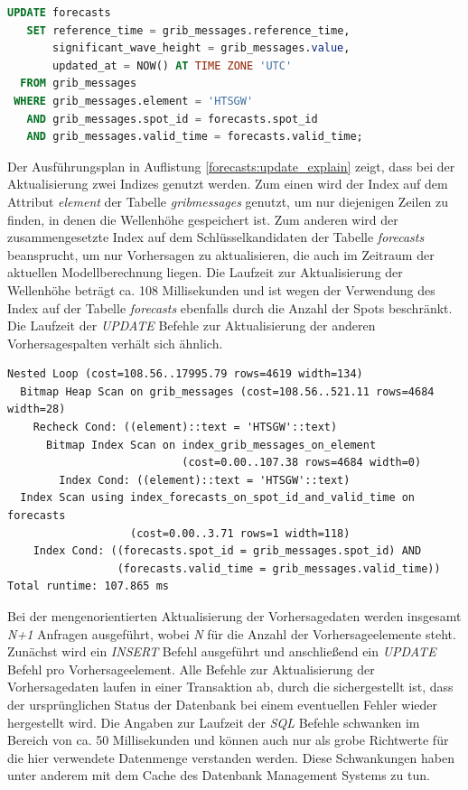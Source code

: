 \begin{lstlisting}[captionpos=b, caption=Aktualisierung der Wellenhöhe, label=forecasts:update, language=SQL]
UPDATE forecasts
   SET reference_time = grib_messages.reference_time,
       significant_wave_height = grib_messages.value,
       updated_at = NOW() AT TIME ZONE 'UTC'
  FROM grib_messages
 WHERE grib_messages.element = 'HTSGW'
   AND grib_messages.spot_id = forecasts.spot_id
   AND grib_messages.valid_time = forecasts.valid_time;
\end{lstlisting}

Der Ausführungsplan in Auflistung \ref{forecasts:update_explain}
zeigt, dass bei der Aktualisierung zwei Indizes genutzt werden. Zum
einen wird der Index auf dem Attribut \textit{element} der Tabelle
\textit{grib\textunderscore messages} genutzt, um nur diejenigen
Zeilen zu finden, in denen die Wellenhöhe gespeichert ist. Zum anderen
wird der zusammengesetzte Index auf dem Schlüsselkandidaten der
Tabelle \textit{forecasts} beansprucht, um nur Vorhersagen zu
aktualisieren, die auch im Zeitraum der aktuellen Modellberechnung
liegen. Die Laufzeit zur Aktualisierung der Wellenhöhe beträgt ca. 108
Millisekunden und ist wegen der Verwendung des Index auf der Tabelle
\textit{forecasts} ebenfalls durch die Anzahl der Spots
beschränkt. Die Laufzeit der \textit{UPDATE} Befehle zur
Aktualisierung der anderen Vorhersagespalten verhält sich ähnlich.

\begin{lstlisting}[captionpos=b, caption=Ausführungsplan der Aktualisierung, label=forecasts:update_explain]
Nested Loop (cost=108.56..17995.79 rows=4619 width=134)
  Bitmap Heap Scan on grib_messages (cost=108.56..521.11 rows=4684 width=28)
    Recheck Cond: ((element)::text = 'HTSGW'::text)
      Bitmap Index Scan on index_grib_messages_on_element  
                           (cost=0.00..107.38 rows=4684 width=0)
        Index Cond: ((element)::text = 'HTSGW'::text)
  Index Scan using index_forecasts_on_spot_id_and_valid_time on forecasts 
                   (cost=0.00..3.71 rows=1 width=118)
    Index Cond: ((forecasts.spot_id = grib_messages.spot_id) AND 
                 (forecasts.valid_time = grib_messages.valid_time))
Total runtime: 107.865 ms
\end{lstlisting}

Bei der mengenorientierten Aktualisierung der Vorhersagedaten werden
insgesamt \textit{N+1} Anfragen ausgeführt, wobei \textit{N} für die
Anzahl der Vorhersageelemente steht. Zunächst wird ein \textit{INSERT}
Befehl ausgeführt und anschließend ein \textit{UPDATE} Befehl pro
Vorhersageelement. Alle Befehle zur Aktualisierung der Vorhersagedaten
laufen in einer Transaktion ab, durch die sichergestellt ist, dass der
ursprünglichen Status der Datenbank bei einem eventuellen Fehler
wieder hergestellt wird. Die Angaben zur Laufzeit der \textit{SQL}
Befehle schwanken im Bereich von ca. 50 Millisekunden und können auch
nur als grobe Richtwerte für die hier verwendete Datenmenge verstanden
werden. Diese Schwankungen haben unter anderem mit dem Cache des
Datenbank Management Systems zu tun.

